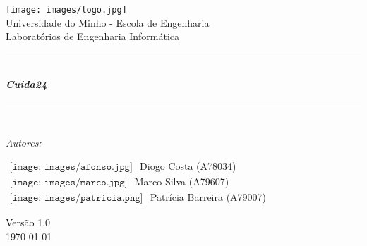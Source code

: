 \documentclass[a4paper]{article}
\begin{document}
\begin{titlepage}
\begin{center}


\texttt{[image: images/logo.jpg]}\\[0.5cm]

{\large Universidade do Minho - Escola de Engenharia}\\[0.5cm]

{\large Laboratórios de Engenharia Informática}\\[0.8cm]

\rule{\linewidth}{0.5mm} \\[0.4cm]
{ \huge \bfseries \textit{Cuida24}\\[0.4cm] }
\rule{\linewidth}{0.5mm} \\[1.5cm]

\noindent
\begin{minipage}{0.5\textwidth}
  \begin{center} \large
    \textit{Autores:}\\[0.3cm]
  \end{center}
  \begin{flushleft} \large
    $ \begin{array}{l} \texttt{[image: images/afonso.jpg]} \end{array} $
    Diogo Costa \textsc{(A78034)}\\[0.3cm]
    $ \begin{array}{l} \texttt{[image: images/marco.jpg]} \end{array} $
    Marco Silva \textsc{(A79607)}\\[0.3cm]
    $ \begin{array}{l} \texttt{[image: images/patricia.png]} \end{array} $
    Patrícia Barreira \textsc{(A79007)}\\[0.3cm]
  \end{flushleft}
\end{minipage}%
\vfill

{\large Versão 1.0 \\[0.2cm] \today}

\end{center}
\end{titlepage}


\begin{abstract}

\end{abstract}
\end{document}
